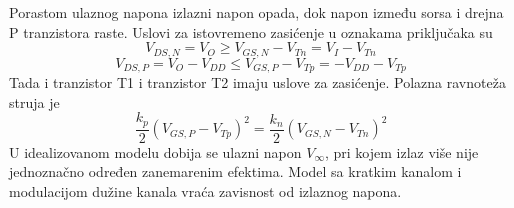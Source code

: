 Porastom ulaznog napona izlazni napon opada, dok napon između sorsa i drejna P tranzistora raste. Uslovi za istovremeno zasićenje u oznakama priključaka su
\[V_{DS,N}=V_O\ge V_{GS,N}-V_{Tn}=V_I-V_{Tn}\]
\[V_{DS,P}=V_O-V_{DD}\le V_{GS,P}-V_{Tp}=-V_{DD}-V_{Tp}\]
Tada i tranzistor T1 i tranzistor T2 imaju uslove za zasićenje. Polazna ravnoteža struja je
\[\frac{k_p}2(V_{GS,P}-V_{Tp})^2=\frac{k_n}2(V_{GS,N}-V_{Tn})^2\]
U idealizovanom modelu dobija se ulazni napon $V_\infty$, pri kojem izlaz više nije jednoznačno određen zanemarenim efektima. Model sa kratkim kanalom i modulacijom dužine kanala vraća zavisnost od izlaznog napona.

